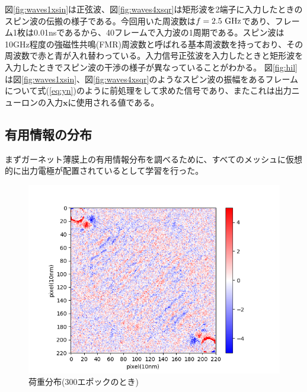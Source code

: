 \documentclass[a4j, twocolumn]{jsarticle}
\begin{document}
図\ref{fig:waves1xsin}は正弦波、図\ref{fig:waves4xsqr}は矩形波を2端子に入力したときのスピン波の伝搬の様子である。今回用いた周波数は$f=2.5~\rm{GHz}$であり、フレーム1枚は0.01nsであるから、40フレームで入力波の1周期である。スピン波は10GHz程度の強磁性共鳴(FMR)周波数と呼ばれる基本周波数を持っており、その周波数で赤と青が入れ替わっている。入力信号正弦波を入力したときと矩形波を入力したときでスピン波の干渉の様子が異なっていることがわかる。
図\ref{fig:hil}は図\ref{fig:waves1xsin}、図\ref{fig:waves4xsqr}のようなスピン波の振幅をあるフレームについて式(\ref{eq:yn})のように前処理をして求めた信号であり、またこれは出力ニューロンの入力$\bm{x}$に使用される値である。

\subsection{有用情報の分布}
\label{subsec:info}

まずガーネット薄膜上の有用情報分布を調べるために、すべてのメッシュに仮想的に出力電極が配置されているとして学習を行った。

\begin{figure}
\centering
\includegraphics[width=1\hsize]{./figures/meanweightsinsqr128_32i_l_hilsinsqr128_32i_t_hil_timesequence_epoch300_batchsize32_mask10_eta30_transition0} 
\caption{荷重分布(300エポックのとき)}
\label{fig:weightsinsqr128_32i}
\end{figure}
\end{document}
